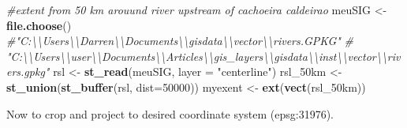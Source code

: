 \documentclass[
]{article}
\newenvironment{Shaded}{\begin{snugshade}}{\end{snugshade}}
\newcommand{\AttributeTok}[1]{\textcolor[rgb]{0.13,0.29,0.53}{#1}}
\newcommand{\CommentTok}[1]{\textcolor[rgb]{0.56,0.35,0.01}{\textit{#1}}}
\newcommand{\DecValTok}[1]{\textcolor[rgb]{0.00,0.00,0.81}{#1}}
\newcommand{\FunctionTok}[1]{\textcolor[rgb]{0.13,0.29,0.53}{\textbf{#1}}}
\newcommand{\NormalTok}[1]{#1}
\newcommand{\OtherTok}[1]{\textcolor[rgb]{0.56,0.35,0.01}{#1}}
\newcommand{\StringTok}[1]{\textcolor[rgb]{0.31,0.60,0.02}{#1}}
\begin{document}
\begin{Shaded}
\begin{Highlighting}[]
\CommentTok{\#extent from 50 km arouund river upstream of cachoeira caldeirao}
\NormalTok{meuSIG }\OtherTok{\textless{}{-}} \FunctionTok{file.choose}\NormalTok{()}
\CommentTok{\#"C:\textbackslash{}\textbackslash{}Users\textbackslash{}\textbackslash{}Darren\textbackslash{}\textbackslash{}Documents\textbackslash{}\textbackslash{}gisdata\textbackslash{}\textbackslash{}vector\textbackslash{}\textbackslash{}rivers.GPKG"}
\CommentTok{\# "C:\textbackslash{}\textbackslash{}Users\textbackslash{}\textbackslash{}user\textbackslash{}\textbackslash{}Documents\textbackslash{}\textbackslash{}Articles\textbackslash{}\textbackslash{}gis\_layers\textbackslash{}\textbackslash{}gisdata\textbackslash{}\textbackslash{}inst\textbackslash{}\textbackslash{}vector\textbackslash{}\textbackslash{}rivers.gpkg"}
\NormalTok{rsl }\OtherTok{\textless{}{-}} \FunctionTok{st\_read}\NormalTok{(meuSIG, }\AttributeTok{layer =} \StringTok{"centerline"}\NormalTok{)}
\NormalTok{rsl\_50km }\OtherTok{\textless{}{-}} \FunctionTok{st\_union}\NormalTok{(}\FunctionTok{st\_buffer}\NormalTok{(rsl, }\AttributeTok{dist=}\DecValTok{50000}\NormalTok{))}
\NormalTok{myexent }\OtherTok{\textless{}{-}} \FunctionTok{ext}\NormalTok{(}\FunctionTok{vect}\NormalTok{(rsl\_50km)) }
\end{Highlighting}
\end{Shaded}

Now to crop and project to desired coordinate system (epsg:31976).
\end{document}

